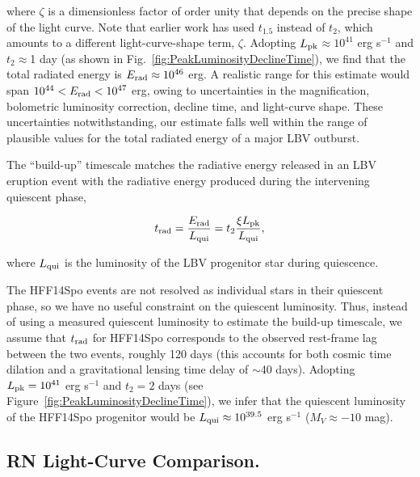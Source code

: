 \documentclass{article}
\providecommand\citep{\cite}
\def\spock{HFF14Spo\xspace}
\def\Lpk{\ensuremath{L_{\rm pk}}\xspace}
\def\t2{\ensuremath{t_{2}}\xspace}
\begin{document}
\noindent where $\zeta$ is a dimensionless factor of order unity that
depends on the precise shape of the light
curve\cite{Smith:2011b}. Note that earlier work\cite{Smith:2011b} has
used $t_{1.5}$ instead of $t_2$, which amounts to a different
light-curve-shape term, $\zeta$.  Adopting \Lpk$\approx10^{41}$ erg
s$^{-1}$ and \t2$\approx$1 day (as shown in
Fig.~\ref{fig:PeakLuminosityDeclineTime}), we find that the total
radiated energy is $E_{\rm rad}\approx10^{46}$ erg.  A realistic range
for this estimate would span $10^{44}<E_{\rm rad}<10^{47}$ erg, owing to
uncertainties in the magnification, bolometric luminosity correction,
decline time, and light-curve shape. These uncertainties
notwithstanding, our estimate falls well within the range of plausible
values for the total radiated energy of a major LBV outburst.

The ``build-up'' timescale\citep{Smith:2011b} matches the radiative
energy released in an LBV eruption event with the radiative energy
produced during the intervening quiescent phase,

\begin{equation}
  \label{eqn:trad}
t_{\rm rad} = \frac{E_{\rm rad}}{L_{\rm qui}} = \t2 \frac{\xi\Lpk}{L_{\rm qui}},
\end{equation}

\noindent where $L_{\rm qui}$ is the luminosity of the LBV progenitor
star during quiescence.

The \spock events are not resolved as individual stars in their
quiescent phase, so we have no useful constraint on the quiescent
luminosity. Thus, instead of using a measured quiescent luminosity to
estimate the build-up timescale, we assume that $t_{\rm rad}$ for
\spock corresponds to the observed rest-frame lag between the two
events, roughly 120 days (this accounts for both cosmic time dilation
and a gravitational lensing time delay of $\sim$40 days). Adopting
$\Lpk=10^{41}$ erg s$^{-1}$ and $\t2=2$ days (see
Figure~\ref{fig:PeakLuminosityDeclineTime}), we infer that the
quiescent luminosity of the \spock progenitor would be
$L_{\rm qui}\approx10^{39.5}$ erg s$^{-1}$ ($M_V\approx-10$ mag).

\subsection{RN Light-Curve Comparison.}\label{sec:RNLightCurves}


\end{document}
